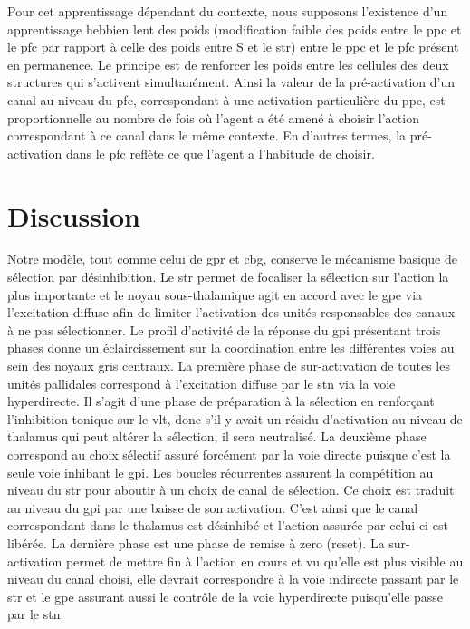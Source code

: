 Pour cet apprentissage dépendant du contexte, nous supposons l'existence d'un apprentissage hebbien lent des poids (modification faible des poids entre le \gls{ppc} et le \gls{pfc} par rapport à celle des poids entre S et le \gls{str}) entre le \gls{ppc} et le \gls{pfc} présent en permanence. Le principe est de renforcer les poids entre les cellules des deux structures qui s'activent simultanément. Ainsi la valeur de la pré-activation d'un canal au niveau du \gls{pfc}, correspondant à une activation particulière du \gls{ppc}, est proportionnelle au nombre de fois o\`u l'agent a été amené à choisir l'action correspondant à ce canal dans le même contexte. En d'autres termes, la pré-activation dans le \gls{pfc} reflète ce que l'agent a l'habitude de choisir.
 
\section{Discussion}

Notre modèle, tout comme celui de \gls{gpr} et \gls{cbg}, conserve le mécanisme basique de sélection par désinhibition. Le \gls{str} permet de focaliser la sélection sur l'action la plus importante et le noyau sous-thalamique agit en accord avec le \gls{gpe} via l'excitation diffuse afin de limiter l'activation des unités responsables des canaux à ne pas sélectionner. Le profil d'activité de la réponse du \gls{gpi} présentant trois phases donne un éclaircissement sur la coordination entre les différentes voies au sein des noyaux gris centraux. La première phase de sur-activation de toutes les unités pallidales correspond à l'excitation diffuse par le \gls{stn} via la voie hyperdirecte. Il s'agit d'une phase de préparation à la sélection en renforçant l'inhibition tonique sur le \gls{vlt}, donc s'il y avait un résidu d'activation au niveau de thalamus qui peut altérer la sélection, il sera neutralisé. La deuxième phase correspond au choix sélectif assuré forcément par la voie directe puisque c'est la seule voie inhibant le \gls{gpi}. Les boucles récurrentes assurent la compétition au niveau du \gls{str} pour aboutir à un choix de canal de sélection. Ce choix est traduit au niveau du \gls{gpi} par une baisse de son activation. C'est ainsi que le canal correspondant dans le thalamus est désinhibé et l'action assurée par celui-ci est libérée. La dernière phase est une phase de remise à zero (reset). La sur-activation permet de mettre fin à l'action en cours et vu qu'elle est plus visible au niveau du canal choisi, elle devrait correspondre à la voie indirecte passant par le \gls{str} et le \gls{gpe} assurant aussi le contrôle de la voie hyperdirecte puisqu'elle passe par le \gls{stn}.\\

